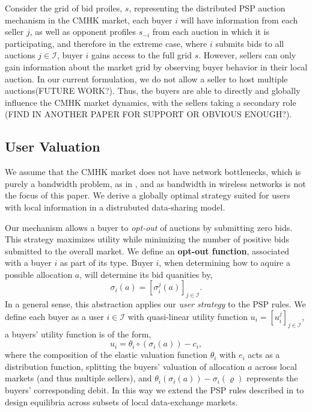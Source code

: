 \documentclass[sigconf, anonymous]{acmart}
\newcommand{\mcI}{\mathcal{I}}
\newcommand{\g}{\sigma}
\theoremstyle{definition}
\begin{document}
Consider the grid of bid proiles, $s$, representing the distributed PSP auction
mechanism in the CMHK market, each buyer $i$ will
have information from each seller $j$, as well as opponent profiles $s_{-i}$
from each auction in which it is participating, and therefore
in the extreme case, where $i$ submits bids to all auctions $j\in\mcI$, buyer
$i$ gains access to the full grid $s$. However, 
sellers can only gain information about the market grid by observing buyer
behavior in their local auction.
In our current formulation, we do not allow a seller to host multiple
auctions(FUTURE WORK?). Thus, the buyers are able to directly and globally
influence the CMHK market dynamics, with the sellers taking a secondary role
(FIND IN ANOTHER PAPER FOR SUPPORT OR OBVIOUS ENOUGH?).



\subsection{User Valuation}

We assume that the CMHK market does not have network
bottlenecks, which is purely a bandwidth problem, as in \cite{semret}, and as
bandwidth in wireless networks is not the focus of this paper. We derive a globally optimal strategy suited for
users with local information in a distrubuted data-sharing model. 

Our mechanism allows a buyer
to \emph{opt-out} of auctions by submitting zero bids. This strategy maximizes
utility while minimizing the number of positive bids submitted to the overall
market. We define an \textbf{opt-out function}, associated with a buyer $i$ as
part of its type. Buyer $i$, when determining how to aquire a possible allocation $a$,
will determine its bid quanities by,
\begin{equation}\label{opt-out}
    \g_i(a) = [\g_i^j(a)]_{j\in\mcI}.
\end{equation}
In a general sense, this abstraction applies our \emph{user strategy}
to the PSP rules.
We define each buyer as a user $i\in\mcI$ with quasi-linear utility
function $u_i = [u_i^j]_{j\in\mcI}$, a buyers' utility function is of the form,
\begin{equation}\label{buyerutility}
    u_i = \theta_i \circ (\g_i(a)) - c_i,
\end{equation}
where the composition of the elastic valuation function $\theta_i$ with $e_i$ acts as a distribution function, splitting
the buyers' valuation of allocation $a$ across local markets (and thus multiple
sellers), and $\theta_i(\g_i(a)) - \g_i(\varrho)$ represents the buyers'
corresponding debit.  
In this way we extend the PSP rules described
in \cite{semret} to design equilibria across subsets of local data-exchange markets.
\end{document}
